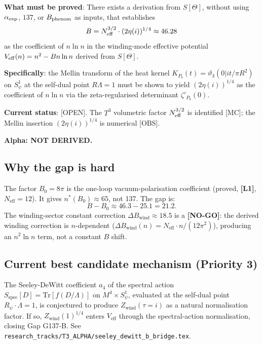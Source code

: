 \documentclass[12pt,a4paper]{article}
\theoremstyle{definition}
\theoremstyle{remark}
\newcommand{\Lone}{\textbf{[L1]}}
\newcommand{\NOGO}{\textbf{[NO-GO]}}
\begin{document}
\begin{tcolorbox}[colback=red!4!white, colframe=red!60!black,
  title={Minimal Missing Theorem --- Gap G137-B (v2)}]
\textbf{What must be proved}: There exists a derivation from
$S[\Theta]$, without using $\alpha_{\rm exp}$, $137$, or
$B_{\rm phenom}$ as inputs, that establishes
\[
  B = N_{\rm eff}^{3/2}\cdot (2\eta(i))^{1/4}
  \approx 46.28
\]
as the coefficient of $n\ln n$ in the winding-mode effective
potential $V_{\rm eff}(n) = n^2 - Bn\ln n$ derived from $S[\Theta]$.

\textbf{Specifically}: the Mellin transform of the heat kernel
$K_{P_b}(t) = \vartheta_3(0|it/\pi R^2)$ on $S^1_\psi$ at the
self-dual point $R\Lambda=1$ must be shown to yield
$(2\eta(i))^{1/4}$ as the coefficient of $n\ln n$ via the
zeta-regularised determinant $\zeta'_{P_b}(0)$.

\textbf{Current status}: [OPEN]. The $T^3$ volumetric factor
$N_{\rm eff}^{3/2}$ is identified [MC]; the Mellin
insertion $(2\eta(i))^{1/4}$ is numerical [OBS].

\textbf{Alpha: NOT DERIVED.}
\end{tcolorbox}

\subsection{Why the gap is hard}

The factor $B_0 = 8\pi$ is the one-loop vacuum-polarisation coefficient
(proved, \Lone, $N_{\mathrm{eff}}=12$).
It gives $n^*(B_0) \approx 65$, not 137.
The gap is:
\begin{equation}
  B - B_0 \approx 46.3 - 25.1 = 21.2.
  \label{eq:gapsize}
\end{equation}
The winding-sector constant correction $\Delta B_{\mathrm{wind}} \approx 18.5$
is a \NOGO: the derived winding correction is $n$-dependent
($\Delta B_{\mathrm{wind}}(n) = N_{\mathrm{eff}}\cdot n/(12\pi^2)$),
producing an $n^2\ln n$ term, not a constant $B$ shift.

\subsection{Current best candidate mechanism (Priority 3)}

The Seeley-DeWitt coefficient $a_4$ of the spectral action
$S_{\mathrm{spec}}[D] = \mathrm{Tr}[f(D/\Lambda)]$
on $M^4\times S^1_\psi$, evaluated at the self-dual point
$R_\psi\cdot\Lambda = 1$, is conjectured to produce
$Z_{\mathrm{wind}}(\tau=i)$ as a natural normalisation factor.
If so, $Z_{\mathrm{wind}}(1)^{1/4}$ enters $V_{\mathrm{eff}}$ through the
spectral-action normalisation, closing Gap G137-B.
See \texttt{research\_tracks/T3\_ALPHA/seeley\_dewitt\_b\_bridge.tex}.
\end{document}
